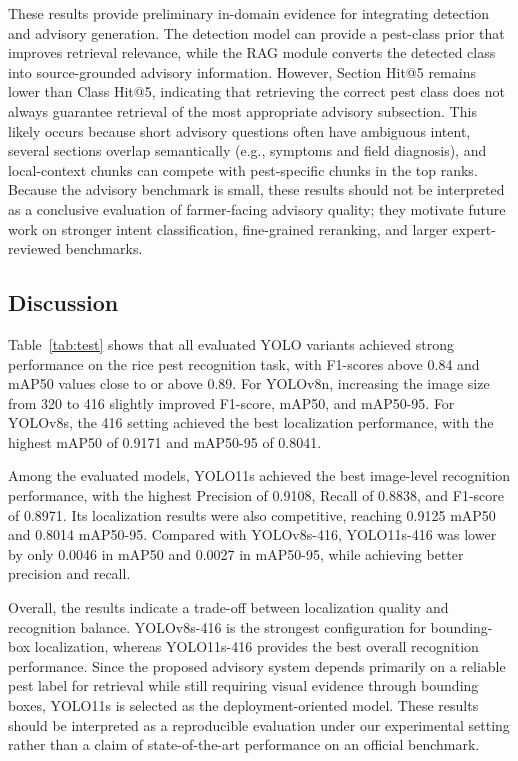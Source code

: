 ﻿\documentclass[11pt]{article}
\begin{document}
These results provide preliminary in-domain evidence for integrating detection and advisory generation. The detection model can provide a pest-class prior that improves retrieval relevance, while the RAG module converts the detected class into source-grounded advisory information. However, Section Hit@5 remains lower than Class Hit@5, indicating that retrieving the correct pest class does not always guarantee retrieval of the most appropriate advisory subsection. This likely occurs because short advisory questions often have ambiguous intent, several sections overlap semantically (e.g., symptoms and field diagnosis), and local-context chunks can compete with pest-specific chunks in the top ranks. Because the advisory benchmark is small, these results should not be interpreted as a conclusive evaluation of farmer-facing advisory quality; they motivate future work on stronger intent classification, fine-grained reranking, and larger expert-reviewed benchmarks.

\subsection{Discussion}

Table~\ref{tab:test} shows that all evaluated YOLO variants achieved strong performance on the rice pest recognition task, with F1-scores above 0.84 and mAP50 values close to or above 0.89. For YOLOv8n, increasing the image size from 320 to 416 slightly improved F1-score, mAP50, and mAP50-95. For YOLOv8s, the 416 setting achieved the best localization performance, with the highest mAP50 of 0.9171 and mAP50-95 of 0.8041.

Among the evaluated models, YOLO11s achieved the best image-level recognition performance, with the highest Precision of 0.9108, Recall of 0.8838, and F1-score of 0.8971. Its localization results were also competitive, reaching 0.9125 mAP50 and 0.8014 mAP50-95. Compared with YOLOv8s-416, YOLO11s-416 was lower by only 0.0046 in mAP50 and 0.0027 in mAP50-95, while achieving better precision and recall.

Overall, the results indicate a trade-off between localization quality and recognition balance. YOLOv8s-416 is the strongest configuration for bounding-box localization, whereas YOLO11s-416 provides the best overall recognition performance. Since the proposed advisory system depends primarily on a reliable pest label for retrieval while still requiring visual evidence through bounding boxes, YOLO11s is selected as the deployment-oriented model. These results should be interpreted as a reproducible evaluation under our experimental setting rather than a claim of state-of-the-art performance on an official benchmark.
\end{document}
